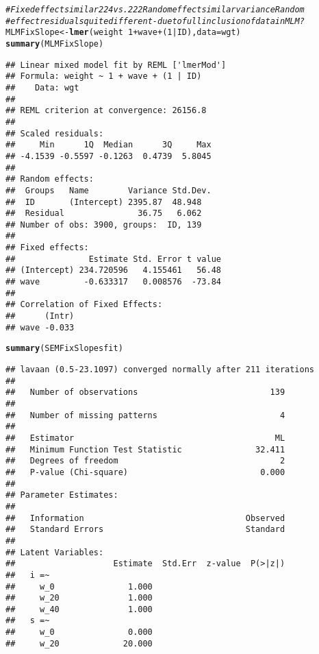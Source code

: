 \documentclass{article}\usepackage[]{graphicx}\usepackage[]{color}
\makeatletter
\newcommand{\hlnum}[1]{\textcolor[rgb]{0.686,0.059,0.569}{#1}}%
\newcommand{\hlcom}[1]{\textcolor[rgb]{0.678,0.584,0.686}{\textit{#1}}}%
\newcommand{\hlopt}[1]{\textcolor[rgb]{0,0,0}{#1}}%
\newcommand{\hlstd}[1]{\textcolor[rgb]{0.345,0.345,0.345}{#1}}%
\newcommand{\hlkwb}[1]{\textcolor[rgb]{0.69,0.353,0.396}{#1}}%
\newcommand{\hlkwc}[1]{\textcolor[rgb]{0.333,0.667,0.333}{#1}}%
\newcommand{\hlkwd}[1]{\textcolor[rgb]{0.737,0.353,0.396}{\textbf{#1}}}%
\newenvironment{kframe}{%
 \def\at@end@of@kframe{}%
 \ifinner\ifhmode%
  \def\at@end@of@kframe{\end{minipage}}%
  \begin{minipage}{\columnwidth}%
 \fi\fi%
 \def\FrameCommand##1{\hskip\@totalleftmargin \hskip-\fboxsep
 \colorbox{shadecolor}{##1}\hskip-\fboxsep
     \hskip-\linewidth \hskip-\@totalleftmargin \hskip\columnwidth}%
 \MakeFramed {\advance\hsize-\width
   \@totalleftmargin\z@ \linewidth\hsize
   \@setminipage}}%
 {\par\unskip\endMakeFramed%
 \at@end@of@kframe}
\newenvironment{knitrout}{}{} %
\makeatother
\begin{document}
\begin{knitrout}
\begin{kframe}
\begin{verbatim}
\end{verbatim}
\begin{alltt}
\hlcom{# Fixed effect similar 224 vs. 222 Random effect similar variance Random}
\hlcom{# effect residuals quite different - due to full inclusion of data in MLM?}
\hlstd{MLMFixSlope} \hlkwb{<-} \hlkwd{lmer}\hlstd{(weight} \hlopt{~} \hlnum{1} \hlopt{+} \hlstd{wave} \hlopt{+} \hlstd{(}\hlnum{1} \hlopt{|} \hlstd{ID),} \hlkwc{data} \hlstd{= wgt)}
\hlkwd{summary}\hlstd{(MLMFixSlope)}
\end{alltt}
\begin{verbatim}
## Linear mixed model fit by REML ['lmerMod']
## Formula: weight ~ 1 + wave + (1 | ID)
##    Data: wgt
## 
## REML criterion at convergence: 26156.8
## 
## Scaled residuals: 
##     Min      1Q  Median      3Q     Max 
## -4.1539 -0.5597 -0.1263  0.4739  5.8045 
## 
## Random effects:
##  Groups   Name        Variance Std.Dev.
##  ID       (Intercept) 2395.87  48.948  
##  Residual               36.75   6.062  
## Number of obs: 3900, groups:  ID, 139
## 
## Fixed effects:
##               Estimate Std. Error t value
## (Intercept) 234.720596   4.155461   56.48
## wave         -0.633317   0.008576  -73.84
## 
## Correlation of Fixed Effects:
##      (Intr)
## wave -0.033
\end{verbatim}
\begin{alltt}
\hlkwd{summary}\hlstd{(SEMFixSlopesfit)}
\end{alltt}
\begin{verbatim}
## lavaan (0.5-23.1097) converged normally after 211 iterations
## 
##   Number of observations                           139
## 
##   Number of missing patterns                         4
## 
##   Estimator                                         ML
##   Minimum Function Test Statistic               32.411
##   Degrees of freedom                                 2
##   P-value (Chi-square)                           0.000
## 
## Parameter Estimates:
## 
##   Information                                 Observed
##   Standard Errors                             Standard
## 
## Latent Variables:
##                    Estimate  Std.Err  z-value  P(>|z|)
##   i =~                                                
##     w_0               1.000                           
##     w_20              1.000                           
##     w_40              1.000                           
##   s =~                                                
##     w_0               0.000                           
##     w_20             20.000                           

\end{verbatim}
\end{kframe}
\end{knitrout}
\end{document}
